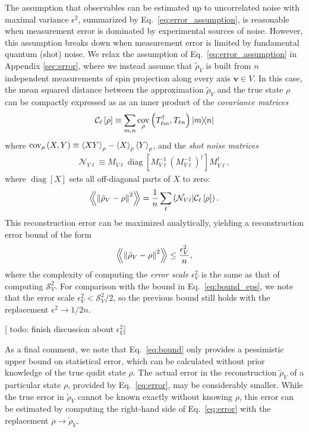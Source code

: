 \documentclass[notitlepage,twocolumn]{revtex4-2}
\newcommand{\f}[2]{\dfrac{#1}{#2}} %
\newcommand{\p}[1]{\left(#1\right)} %
\renewcommand{\sp}[1]{\left[#1\right]} %
\newcommand{\bk}{\Braket} %
\renewcommand{\v}{\bm} %
\newcommand{\Bbk}[1]
{\left\langle\!\!\left\langle #1 \right\rangle\!\!\right\rangle}
\newcommand{\C}{\mathcal{C}}
\newcommand{\N}{\mathcal{N}}
\renewcommand{\S}{\mathcal{S}}
\def\obk#1{\mathinner{({#1})}}
\DeclareMathOperator{\cov}{cov}
\DeclareMathOperator{\diag}{diag}
\newcommand{\red}[1]{{\color{red} #1}}
\begin{document}
The assumption that observables can be estimated up to uncorrelated noise with maximal variance $\epsilon^2$, summarized by Eq.~\eqref{eq:error_assumption}, is reasonable when measurement error is dominated by experimental sources of noise.
However, this assumption breaks down when measurement error is limited by fundamental quantum (shot) noise.
We relax the assumption of Eq.~\eqref{eq:error_assumption} in Appendix \ref{sec:error}, where we instead assume that $\tilde\rho_V$ is built from $n$ independent measurements of spin projection along every axis $\v v\in V$.
In this case, the mean squared distance between the approximation $\tilde\rho_V$ and the true state $\rho$ can be compactly expressed as as an inner product of the {\it covariance matrices}
\begin{align}
  \C_\ell\sp{\rho} \equiv \sum_{m,n}
  \cov_\rho\p{T_{\ell m}^\dag, T_{\ell n}} \op{m}{n}
\end{align}
where $\cov_\rho\p{X,Y} \equiv \bk{XY}_\rho - \bk{X}_\rho \bk{Y}_\rho$, and the {\it shot noise matrices}
\begin{align}
  \N_{V\ell} \equiv M_{V\ell} \diag\sp{M_{V\ell}^{-1}
    \p{M_{V\ell}^{-1}}^\dag} M_{V\ell}^\dag,
\end{align}
where $\diag\sp{X}$ sets all off-diagonal parts of $X$ to zero:
\begin{align}
  \Bbk{\norm{\tilde\rho_V-\rho}^2}
  = \f1n \sum_\ell \obk{\N_{V\ell}|\C_\ell\sp{\rho}}.
  \label{eq:error}
\end{align}
This reconstruction error can be maximized analytically, yielding a reconstruction error bound of the form
\begin{align}
  \Bbk{\norm{\tilde\rho_V-\rho}^2} \le \f{\epsilon_V^2}{n},
  \label{eq:bound}
\end{align}
where the complexity of computing the {\it error scale} $\epsilon_V^2$ is the same as that of computing $\S_V^2$.
For comparison with the bound in Eq.~\eqref{eq:bound_eps}, we note that the error scale $\epsilon_V^2<\S_V^2/2$, so the previous bound still holds with the replacement $\epsilon^2\to1/2n$.

[\red{todo: finish discussion about $\epsilon_V^2$}]

As a final comment, we note that Eq.~\eqref{eq:bound} only provides a pessimistic upper bound on statistical error, which can be calculated without prior knowledge of the true qudit state $\rho$.
The actual error in the reconstruction $\tilde\rho_V$ of a particular state $\rho$, provided by Eq.~\eqref{eq:error}, may be considerably smaller.
While the true error in $\tilde\rho_V$ cannot be known exactly without knowing $\rho$, this error can be estimated by computing the right-hand side of Eq.~\eqref{eq:error} with the replacement $\rho\to\tilde\rho_V$.
\end{document}
